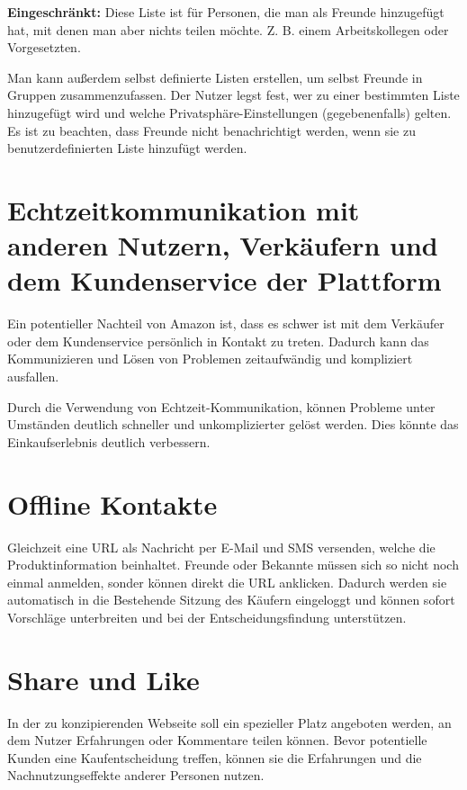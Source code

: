 \textbf{Eingeschränkt:} Diese Liste ist für Personen, die man als Freunde hinzugefügt hat, mit denen man aber nichts teilen möchte. Z. B. einem Arbeitskollegen oder Vorgesetzten.

Man kann außerdem selbst definierte Listen erstellen,  um selbst Freunde in Gruppen zusammenzufassen. Der Nutzer legst fest, wer zu einer bestimmten Liste hinzugefügt wird und welche Privatsphäre-Einstellungen (gegebenenfalls) gelten. Es ist zu beachten, dass Freunde nicht benachrichtigt werden, wenn sie zu benutzerdefinierten Liste hinzufügt werden.


\section{Echtzeitkommunikation mit anderen Nutzern, Verkäufern und dem Kundenservice der Plattform}

Ein potentieller Nachteil von Amazon ist, dass es schwer ist mit dem Verkäufer oder dem Kundenservice persönlich in Kontakt zu treten. Dadurch kann das Kommunizieren und Lösen von Problemen zeitaufwändig und kompliziert ausfallen.

Durch die Verwendung von Echtzeit-Kommunikation, können Probleme unter Umständen deutlich schneller und unkomplizierter gelöst werden. Dies könnte das Einkaufserlebnis deutlich verbessern.


\section{Offline Kontakte}

Gleichzeit eine URL als Nachricht per E-Mail und SMS versenden, welche die Produktinformation beinhaltet. Freunde oder Bekannte müssen sich so nicht noch einmal anmelden, sonder können direkt die URL anklicken. Dadurch werden sie automatisch in die Bestehende Sitzung des Käufern eingeloggt und können sofort Vorschläge unterbreiten und bei der Entscheidungsfindung unterstützen.


\section{Share und Like}

In der zu konzipierenden Webseite soll ein spezieller Platz angeboten werden, an dem Nutzer Erfahrungen oder Kommentare teilen können. Bevor potentielle Kunden eine Kaufentscheidung treffen, können sie die Erfahrungen und die Nachnutzungseffekte anderer Personen nutzen.


